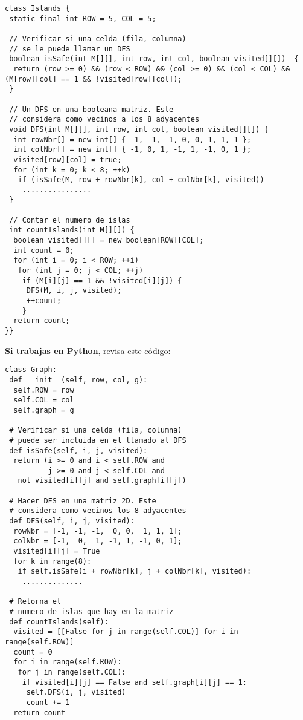 \documentclass[10 pt]{article}
\begin{document}
\begin{multicols}{2}
{\footnotesize
\begin{lstlisting}
class Islands { 
 static final int ROW = 5, COL = 5; 
  
 // Verificar si una celda (fila, columna) 
 // se le puede llamar un DFS
 boolean isSafe(int M[][], int row, int col, boolean visited[][])  { 
  return (row >= 0) && (row < ROW) && (col >= 0) && (col < COL) && (M[row][col] == 1 && !visited[row][col]); 
 } 
  
 // Un DFS en una booleana matriz. Este
 // considera como vecinos a los 8 adyacentes
 void DFS(int M[][], int row, int col, boolean visited[][]) {         
  int rowNbr[] = new int[] { -1, -1, -1, 0, 0, 1, 1, 1 }; 
  int colNbr[] = new int[] { -1, 0, 1, -1, 1, -1, 0, 1 }; 
  visited[row][col] = true; 
  for (int k = 0; k < 8; ++k) 
   if (isSafe(M, row + rowNbr[k], col + colNbr[k], visited)) 
    ................ 
 } 
  
 // Contar el numero de islas
 int countIslands(int M[][]) { 
  boolean visited[][] = new boolean[ROW][COL]; 
  int count = 0; 
  for (int i = 0; i < ROW; ++i) 
   for (int j = 0; j < COL; ++j) 
    if (M[i][j] == 1 && !visited[i][j]) { 
     DFS(M, i, j, visited); 
     ++count; 
    } 
  return count; 
}} 
\end{lstlisting}
}

\textbf{Si trabajas en Python}, revisa este código:


{\footnotesize
\begin{lstlisting}
class Graph: 
 def __init__(self, row, col, g): 
  self.ROW = row 
  self.COL = col 
  self.graph = g 
  
 # Verificar si una celda (fila, columna)
 # puede ser incluida en el llamado al DFS
 def isSafe(self, i, j, visited): 
  return (i >= 0 and i < self.ROW and 
          j >= 0 and j < self.COL and 
   not visited[i][j] and self.graph[i][j]) 
              
 # Hacer DFS en una matriz 2D. Este  
 # considera como vecinos los 8 adyacentes
 def DFS(self, i, j, visited): 
  rowNbr = [-1, -1, -1,  0, 0,  1, 1, 1]; 
  colNbr = [-1,  0,  1, -1, 1, -1, 0, 1]; 
  visited[i][j] = True
  for k in range(8): 
   if self.isSafe(i + rowNbr[k], j + colNbr[k], visited): 
    ..............
  
 # Retorna el
 # numero de islas que hay en la matriz
 def countIslands(self): 
  visited = [[False for j in range(self.COL)] for i in range(self.ROW)] 
  count = 0
  for i in range(self.ROW): 
   for j in range(self.COL): 
    if visited[i][j] == False and self.graph[i][j] == 1: 
     self.DFS(i, j, visited) 
     count += 1
  return count 
\end{lstlisting}
}


\end{multicols}
\end{document}
